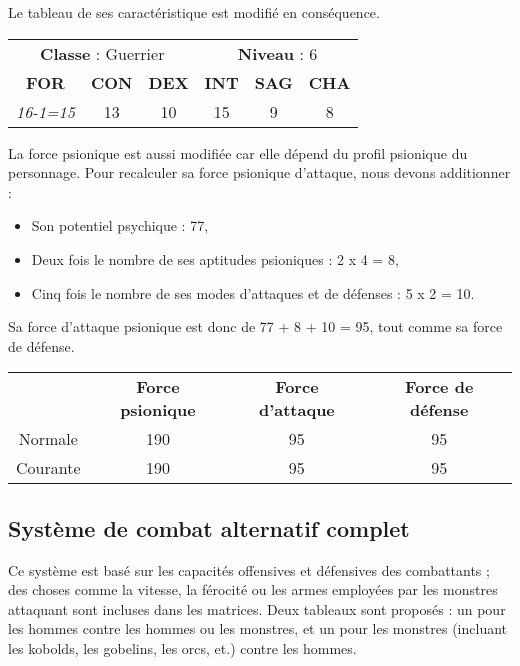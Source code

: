 \bigskip

Le tableau de ses caractéristique est modifié en conséquence.

\bigskip

\begin{tabular}{cccccc}
\multicolumn{3}{c}{\textbf{Classe} : Guerrier} & \multicolumn{3}{c}{\textbf{Niveau} : 6} \\
\textbf{FOR} & \textbf{CON} & \textbf{DEX} & \textbf{INT} & \textbf{SAG} & \textbf{CHA} \\
\textit{16-1=15} & 13 & 10 & 15 & 9 & 8 \\
\end{tabular}

\bigskip

La force psionique est aussi modifiée car elle dépend du profil psionique du personnage. Pour recalculer sa force psionique d'attaque, nous devons additionner :

\bigskip

\begin{itemize}
\item Son potentiel psychique : 77,
\item Deux fois le nombre de ses aptitudes psioniques : 2 x 4 = 8,
\item Cinq fois le nombre de ses modes d'attaques et de défenses : 5 x 2 = 10.
\end{itemize}

\bigskip

Sa force d'attaque psionique est donc de 77 + 8 + 10 = 95, tout comme sa force de défense.

\bigskip

\begin{tabular}{cccc}
& \textbf{Force psionique} & \textbf{Force d'attaque} & \textbf{Force de défense}  \\
Normale     & 190 & 95 & 95 \\
Courante    & 190 & 95 & 95 \\
\end{tabular}

\newpage
\subsection*{Système de combat alternatif complet}
\label{custom-combat-alternatif}

Ce système est basé sur les capacités offensives et défensives des combattants ; des choses comme la vitesse, la férocité ou les armes employées par les monstres attaquant sont incluses dans les matrices. Deux tableaux sont proposés : un pour les hommes contre les hommes ou les monstres, et un pour les monstres (incluant les kobolds, les gobelins, les orcs, et.) contre les hommes.

